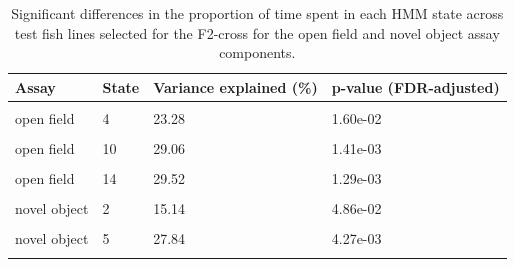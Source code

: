 \documentclass[
]{book}
\begin{document}
\begin{table}

\caption{\label{tab:mikk-dge-F0}Significant differences in the proportion of time spent in each HMM state across test fish lines selected for the F2-cross for the open field and novel object assay components.}
\centering
\begin{tabular}[t]{llll}
\toprule
Assay & State & Variance explained (\%) & p-value (FDR-adjusted)\\
\midrule
\cellcolor{gray!6}{open field} & \cellcolor{gray!6}{3} & \cellcolor{gray!6}{21.53} & \cellcolor{gray!6}{2.67e-03}\\
open field & 4 & 23.28 & 1.60e-02\\
\cellcolor{gray!6}{open field} & \cellcolor{gray!6}{5} & \cellcolor{gray!6}{20.61} & \cellcolor{gray!6}{3.15e-02}\\
open field & 10 & 29.06 & 1.41e-03\\
\cellcolor{gray!6}{open field} & \cellcolor{gray!6}{12} & \cellcolor{gray!6}{24.91} & \cellcolor{gray!6}{1.45e-02}\\
\addlinespace
open field & 14 & 29.52 & 1.29e-03\\
\cellcolor{gray!6}{novel object} & \cellcolor{gray!6}{1} & \cellcolor{gray!6}{16.21} & \cellcolor{gray!6}{1.90e-02}\\
novel object & 2 & 15.14 & 4.86e-02\\
\cellcolor{gray!6}{novel object} & \cellcolor{gray!6}{4} & \cellcolor{gray!6}{26.90} & \cellcolor{gray!6}{5.21e-03}\\
novel object & 5 & 27.84 & 4.27e-03\\
\addlinespace
\cellcolor{gray!6}{novel object} & \cellcolor{gray!6}{10} & \cellcolor{gray!6}{23.73} & \cellcolor{gray!6}{2.81e-02}\\
\bottomrule
\end{tabular}
\end{table}
\end{document}
